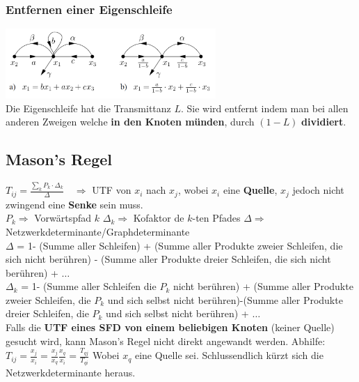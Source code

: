 \begin{multicols}{2}
    \subsubsection{Entfernen einer Eigenschleife}
      \includegraphics[width=8cm]{./images/eigenschleife.png} \\
      Die Eigenschleife hat die Transmittanz $L$. Sie wird entfernt indem man bei allen anderen
      Zweigen welche \textbf{in den Knoten münden}, durch $(1-L)$ \textbf{dividiert}.
 \end{multicols}
 
\newpage 

\subsection{Mason's Regel }
$\boxed{T_{ij} = \frac{\sum\limits_k P_k\cdot\Delta_k}{\Delta}}\quad
\Rightarrow$ UTF von $x_i$ nach $x_j$, wobei \textbf{$x_i$} eine
\textbf{Quelle}, \textbf{$x_j$} jedoch nicht zwingend eine \textbf{Senke} sein
muss. \vspace{0.3cm}\\
$P_k \Rightarrow$ Vorwärtspfad $k$ \qquad $\Delta_k \Rightarrow$ Kofaktor de
$k$-ten Pfades \qquad $\Delta \Rightarrow$ Netzwerkdeterminante/Graphdeterminante\vspace{0.3cm}\\
$\Delta$ = 1- (Summe aller Schleifen) + (Summe aller Produkte zweier
Schleifen, die sich nicht berühren) - (Summe
aller Produkte dreier Schleifen, die sich nicht berühren) + $\ldots$
\vspace{0.3cm}\\
$\Delta_k$ = 1- (Summe aller Schleifen die $P_k$ nicht berühren) + (Summe
aller Produkte zweier Schleifen, die $P_k$ und sich selbst nicht
berühren)-(Summe aller Produkte dreier Schleifen, die $P_k$ und sich selbst
nicht berühren) + $\ldots$ \\

Falls die \textbf{UTF eines SFD von einem beliebigen Knoten} (keiner Quelle)
gesucht wird, kann Mason's Regel nicht direkt angewandt werden. Abhilfe: \\
$T_{ij} = \frac{x_j}{x_i} = \frac{x_j}{x_q} \frac{x_q}{x_i} =
\frac{T_{qj}}{T_{qi}}$ Wobei $x_q$ eine Quelle sei. 
Schlussendlich kürzt sich die Netzwerkdeterminante heraus.


